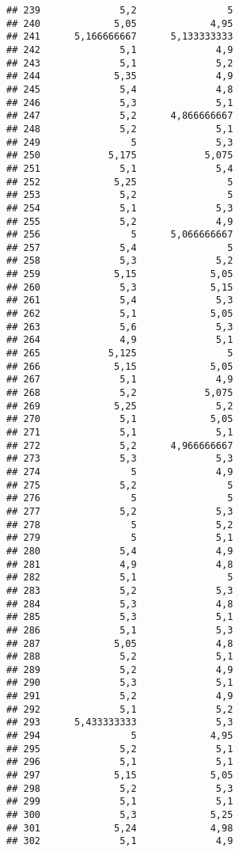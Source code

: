 \documentclass[
]{article}
\begin{document}
\begin{verbatim}
## 239              5,2                5
## 240             5,05             4,95
## 241      5,166666667      5,133333333
## 242              5,1              4,9
## 243              5,1              5,2
## 244             5,35              4,9
## 245              5,4              4,8
## 246              5,3              5,1
## 247              5,2      4,866666667
## 248              5,2              5,1
## 249                5              5,3
## 250            5,175            5,075
## 251              5,1              5,4
## 252             5,25                5
## 253              5,2                5
## 254              5,1              5,3
## 255              5,2              4,9
## 256                5      5,066666667
## 257              5,4                5
## 258              5,3              5,2
## 259             5,15             5,05
## 260              5,3             5,15
## 261              5,4              5,3
## 262              5,1             5,05
## 263              5,6              5,3
## 264              4,9              5,1
## 265            5,125                5
## 266             5,15             5,05
## 267              5,1              4,9
## 268              5,2            5,075
## 269             5,25              5,2
## 270              5,1             5,05
## 271              5,1              5,1
## 272              5,2      4,966666667
## 273              5,3              5,3
## 274                5              4,9
## 275              5,2                5
## 276                5                5
## 277              5,2              5,3
## 278                5              5,2
## 279                5              5,1
## 280              5,4              4,9
## 281              4,9              4,8
## 282              5,1                5
## 283              5,2              5,3
## 284              5,3              4,8
## 285              5,3              5,1
## 286              5,1              5,3
## 287             5,05              4,8
## 288              5,2              5,1
## 289              5,2              4,9
## 290              5,3              5,1
## 291              5,2              4,9
## 292              5,1              5,2
## 293      5,433333333              5,3
## 294                5             4,95
## 295              5,2              5,1
## 296              5,1              5,1
## 297             5,15             5,05
## 298              5,2              5,3
## 299              5,1              5,1
## 300              5,3             5,25
## 301             5,24             4,98
## 302              5,1              4,9

\end{verbatim}
\end{document}
